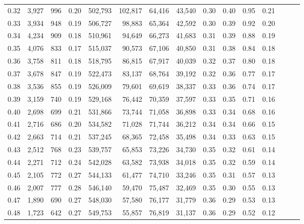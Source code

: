 \begin{tabular}{rrrrrrrrrrrrrrr}
0.32 &   3,927 &    996 &  0.20 &  502,793 &  102,817 &   64,416 &   43,540 &  0.30 &  0.40 &  0.95 &      0.21 \\
0.33 &   3,934 &    948 &  0.19 &  506,727 &   98,883 &   65,364 &   42,592 &  0.30 &  0.39 &  0.92 &      0.20 \\
0.34 &   4,234 &    909 &  0.18 &  510,961 &   94,649 &   66,273 &   41,683 &  0.31 &  0.39 &  0.88 &      0.19 \\
0.35 &   4,076 &    833 &  0.17 &  515,037 &   90,573 &   67,106 &   40,850 &  0.31 &  0.38 &  0.84 &      0.18 \\
0.36 &   3,758 &    811 &  0.18 &  518,795 &   86,815 &   67,917 &   40,039 &  0.32 &  0.37 &  0.80 &      0.18 \\
0.37 &   3,678 &    847 &  0.19 &  522,473 &   83,137 &   68,764 &   39,192 &  0.32 &  0.36 &  0.77 &      0.17 \\
0.38 &   3,536 &    855 &  0.19 &  526,009 &   79,601 &   69,619 &   38,337 &  0.33 &  0.36 &  0.74 &      0.17 \\
0.39 &   3,159 &    740 &  0.19 &  529,168 &   76,442 &   70,359 &   37,597 &  0.33 &  0.35 &  0.71 &      0.16 \\
0.40 &   2,698 &    699 &  0.21 &  531,866 &   73,744 &   71,058 &   36,898 &  0.33 &  0.34 &  0.68 &      0.16 \\
0.41 &   2,716 &    686 &  0.20 &  534,582 &   71,028 &   71,744 &   36,212 &  0.34 &  0.34 &  0.66 &      0.15 \\
0.42 &   2,663 &    714 &  0.21 &  537,245 &   68,365 &   72,458 &   35,498 &  0.34 &  0.33 &  0.63 &      0.15 \\
0.43 &   2,512 &    768 &  0.23 &  539,757 &   65,853 &   73,226 &   34,730 &  0.35 &  0.32 &  0.61 &      0.14 \\
0.44 &   2,271 &    712 &  0.24 &  542,028 &   63,582 &   73,938 &   34,018 &  0.35 &  0.32 &  0.59 &      0.14 \\
0.45 &   2,105 &    772 &  0.27 &  544,133 &   61,477 &   74,710 &   33,246 &  0.35 &  0.31 &  0.57 &      0.13 \\
0.46 &   2,007 &    777 &  0.28 &  546,140 &   59,470 &   75,487 &   32,469 &  0.35 &  0.30 &  0.55 &      0.13 \\
0.47 &   1,890 &    690 &  0.27 &  548,030 &   57,580 &   76,177 &   31,779 &  0.36 &  0.29 &  0.53 &      0.13 \\
0.48 &   1,723 &    642 &  0.27 &  549,753 &   55,857 &   76,819 &   31,137 &  0.36 &  0.29 &  0.52 &      0.12 \\

\end{tabular}
